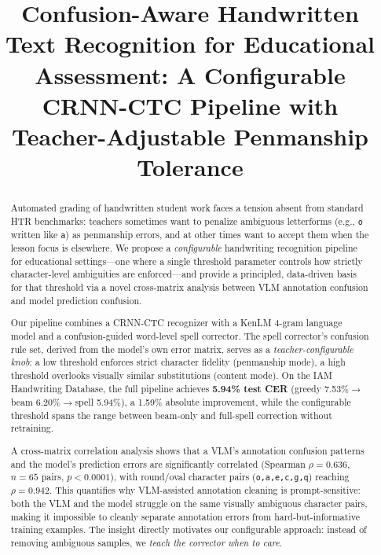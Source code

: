 \documentclass[conference]{IEEEtran}
\begin{document}
\title{Confusion-Aware Handwritten Text Recognition for Educational Assessment: A Configurable CRNN-CTC Pipeline with Teacher-Adjustable Penmanship Tolerance}

\author{
}

\maketitle

\begin{abstract}
Automated grading of handwritten student work faces a tension absent from standard HTR benchmarks: teachers sometimes want to penalize ambiguous letterforms (e.g., \texttt{o} written like \texttt{a}) as penmanship errors, and at other times want to accept them when the lesson focus is elsewhere. We propose a \emph{configurable} handwriting recognition pipeline for educational settings---one where a single threshold parameter controls how strictly character-level ambiguities are enforced---and provide a principled, data-driven basis for that threshold via a novel cross-matrix analysis between VLM annotation confusion and model prediction confusion.

Our pipeline combines a CRNN-CTC recognizer with a KenLM 4-gram language model and a confusion-guided word-level spell corrector. The spell corrector's confusion rule set, derived from the model's own error matrix, serves as a \emph{teacher-configurable knob}: a low threshold enforces strict character fidelity (penmanship mode), a high threshold overlooks visually similar substitutions (content mode). On the IAM Handwriting Database, the full pipeline achieves \textbf{5.94\% test CER} (greedy 7.53\%$\to$beam 6.20\%$\to$spell 5.94\%), a 1.59\% absolute improvement, while the configurable threshold spans the range between beam-only and full-spell correction without retraining.

A cross-matrix correlation analysis shows that a VLM's annotation confusion patterns and the model's prediction errors are significantly correlated (Spearman $\rho=0.636$, $n=65$ pairs, $p<0.0001$), with round/oval character pairs (\texttt{o,a,e,c,g,q}) reaching $\rho=0.942$. This quantifies why VLM-assisted annotation cleaning is prompt-sensitive: both the VLM and the model struggle on the same visually ambiguous character pairs, making it impossible to cleanly separate annotation errors from hard-but-informative training examples. The insight directly motivates our configurable approach: instead of removing ambiguous samples, we \emph{teach the corrector when to care}.


\end{abstract}
\end{document}

